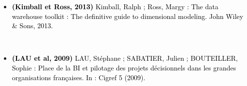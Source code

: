 \begin{itemize}
~~\\
	\item[] \textcolor{black}{
\textbf{(Kimball et Ross, 2013)} Kimball, Ralph ; Ross, Margy : The data warehouse toolkit : The definitive guide to dimensional modeling. John Wiley \& Sons, 2013.	
}

~~\\
	\item[] \textcolor{black}{
\textbf{ (LAU et al, 2009)} LAU, Stéphane ; SABATIER, Julien ; BOUTEILLER, Sophie : Place de la BI et pilotage des projets décisionnels dans les grandes organisations françaises. In : Cigref 5 (2009).	
}

\end{itemize}

